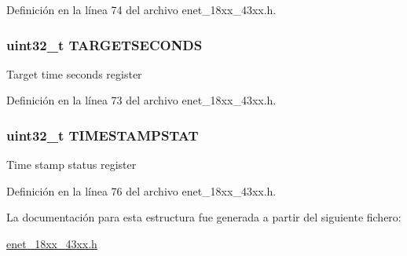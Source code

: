 Definición en la línea 74 del archivo enet\+\_\+18xx\+\_\+43xx.\+h.

\subsubsection[{\texorpdfstring{T\+A\+R\+G\+E\+T\+S\+E\+C\+O\+N\+DS}{TARGETSECONDS}}]{ uint32\+\_\+t T\+A\+R\+G\+E\+T\+S\+E\+C\+O\+N\+DS}\hypertarget{struct_l_p_c___e_n_e_t___t_a44c6ce663ba949f23d6511cf7ef8114d}{}\label{struct_l_p_c___e_n_e_t___t_a44c6ce663ba949f23d6511cf7ef8114d}
Target time seconds register 

Definición en la línea 73 del archivo enet\+\_\+18xx\+\_\+43xx.\+h.

\subsubsection[{\texorpdfstring{T\+I\+M\+E\+S\+T\+A\+M\+P\+S\+T\+AT}{TIMESTAMPSTAT}}]{ uint32\+\_\+t T\+I\+M\+E\+S\+T\+A\+M\+P\+S\+T\+AT}\hypertarget{struct_l_p_c___e_n_e_t___t_ad6c18e29576f80269933faf792f85fe0}{}\label{struct_l_p_c___e_n_e_t___t_ad6c18e29576f80269933faf792f85fe0}
Time stamp status register 

Definición en la línea 76 del archivo enet\+\_\+18xx\+\_\+43xx.\+h.



La documentación para esta estructura fue generada a partir del siguiente fichero\+:\begin{DoxyCompactItemize}
\item 
\hyperlink{enet__18xx__43xx_8h}{enet\+\_\+18xx\+\_\+43xx.\+h}\end{DoxyCompactItemize}
